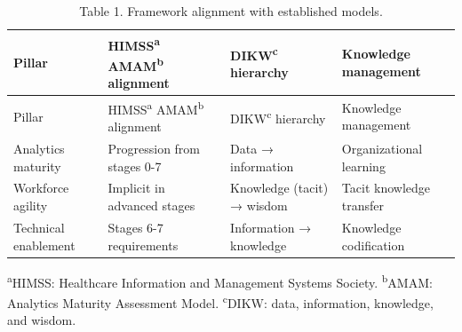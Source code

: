 \documentclass[
  american,
  11pt,
  letterpaper,
  oneside  ,captions=tableheading
]{scrartcl}
\begin{document}
\begin{longtable}[]{@{}
  >{\raggedright\arraybackslash}p{}
  >{\raggedright\arraybackslash}p{}
  >{\raggedright\arraybackslash}p{}
  >{\raggedright\arraybackslash}p{}@{}}
\caption{Table 1. Framework alignment with established models.
\label{tab:alignment}}\tabularnewline
\toprule\noalign{}
\begin{minipage}[b]{\linewidth}\raggedright
Pillar
\end{minipage} & \begin{minipage}[b]{\linewidth}\raggedright
HIMSS\textsuperscript{a} AMAM\textsuperscript{b} alignment
\end{minipage} & \begin{minipage}[b]{\linewidth}\raggedright
DIKW\textsuperscript{c} hierarchy
\end{minipage} & \begin{minipage}[b]{\linewidth}\raggedright
Knowledge management
\end{minipage} \\
\midrule\noalign{}
\endfirsthead
\toprule\noalign{}
\begin{minipage}[b]{\linewidth}\raggedright
Pillar
\end{minipage} & \begin{minipage}[b]{\linewidth}\raggedright
HIMSS\textsuperscript{a} AMAM\textsuperscript{b} alignment
\end{minipage} & \begin{minipage}[b]{\linewidth}\raggedright
DIKW\textsuperscript{c} hierarchy
\end{minipage} & \begin{minipage}[b]{\linewidth}\raggedright
Knowledge management
\end{minipage} \\
\midrule\noalign{}
\endhead
\bottomrule\noalign{}
\endlastfoot
Analytics maturity & Progression from stages 0-7 & Data → information &
Organizational learning \\
Workforce agility & Implicit in advanced stages & Knowledge (tacit) →
wisdom & Tacit knowledge transfer \\
Technical enablement & Stages 6-7 requirements & Information → knowledge
& Knowledge codification \\
\end{longtable}

\textsuperscript{a}HIMSS: Healthcare Information and Management Systems
Society. \textsuperscript{b}AMAM: Analytics Maturity Assessment Model.
\textsuperscript{c}DIKW: data, information, knowledge, and wisdom.
\end{document}
